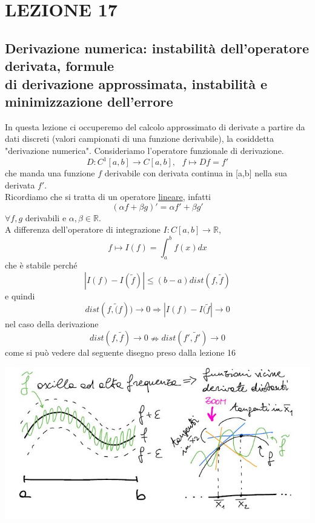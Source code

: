 \documentclass[12pt,a4paper]{article}
\begin{document}
\section*{LEZIONE 17}
\subsection*{Derivazione numerica: instabilità dell'operatore derivata, formule \\
di derivazione approssimata, instabilità e minimizzazione dell'errore}
In questa lezione ci occuperemo del calcolo approssimato di derivate a partire da dati discreti (valori campionati di una funzione derivabile), la cosiddetta "derivazione numerica". Consideriamo l'operatore funzionale di derivazione.
\begin{equation*}
    D:C^1[a,b]\rightarrow C[a,b],\  \  \  f\longmapsto Df=f'
\end{equation*}
che manda una funzione $f$ derivabile con derivata continua in [a,b] nella sua derivata $f'$.\\ Ricordiamo che si tratta di un operatore \underline{lineare}, infatti 
\begin{equation*}
    (\alpha f+\beta g)'=\alpha f'+\beta g'
\end{equation*}
$\forall f,g$ derivabili e $\alpha,\beta\in\mathbb{R}$.\\A differenza dell'operatore di integrazione $I:C[a,b]\rightarrow\mathbb{R}$,
\begin{equation*}
    f\longmapsto I(f)=\int_a^b f(x)dx
\end{equation*}
che è stabile perché
\begin{equation*}
    |I(f)-I(\tilde{f})|\leq(b-a)dist(f,\tilde{f})
\end{equation*}
e quindi 
\begin{equation*}
    dist(f,\tilde(f))\rightarrow0\Rightarrow|I(f)-I(\tilde{f}|\rightarrow0
\end{equation*}
nel caso della derivazione
\begin{equation*}
    dist(f,\tilde{f})\rightarrow0\nRightarrow dist(f',\tilde{f}')\rightarrow0
\end{equation*}
come si può vedere dal seguente disegno preso dalla lezione 16
\begin{center}
    \includegraphics[scale=0.6]{calcolo55.JPG}
\end{center}
\end{document}
